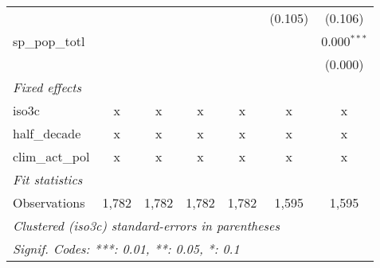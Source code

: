 \begin{tabular}{lcccccc}
                                                     &         &         &         &         & (0.105)        & (0.106)\\   
   sp\_pop\_totl                                     &         &         &         &         &                & 0.000$^{***}$\\   
                                                     &         &         &         &         &                & (0.000)\\   
   \emph{Fixed effects}\\
   iso3c                                             & x       & x       & x       & x       & x              & x\\  
   half\_decade                                      & x       & x       & x       & x       & x              & x\\  
   clim\_act\_pol                                    & x       & x       & x       & x       & x              & x\\  
   \midrule \emph{Fit statistics}\\
   Observations                                      & 1,782   & 1,782   & 1,782   & 1,782   & 1,595          & 1,595\\  
   \midrule
   \multicolumn{7}{l}{\emph{Clustered (iso3c) standard-errors in parentheses}}\\
   \multicolumn{7}{l}{\emph{Signif. Codes: ***: 0.01, **: 0.05, *: 0.1}}\\
\end{tabular}
\par\endgroup


